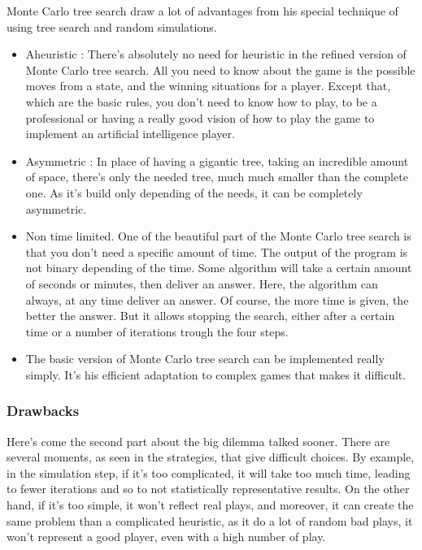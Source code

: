 Monte Carlo tree search draw a lot of advantages from his special technique of using tree search and random simulations. 
\begin{itemize}
\item Aheuristic : There's absolutely no need for heuristic in the refined version of Monte Carlo tree search. All you need to know about the game is the possible moves from a state, and the winning situations for a player. Except that, which are the basic rules, you don't need to know how to play, to be a professional or having a really good vision of how to play the game to implement an artificial intelligence player.
\item Asymmetric : In place of having a gigantic tree, taking an incredible amount of space, there's only the needed tree, much much smaller than the complete one. As it's build only depending of the needs, it can be completely asymmetric. 
\item Non time limited. One of the beautiful part of the Monte Carlo tree search is that you don't need a specific amount of time. The output of the program is not binary depending of the time. Some algorithm will take a certain amount of seconds or minutes, then deliver an answer. Here, the algorithm can always, at any time deliver an answer. Of course, the more time is given, the better the answer. But it allows stopping the search, either after a certain time or a number of iterations trough the four steps. 
\item The basic version of Monte Carlo tree search can be implemented really simply. It's his efficient adaptation to complex games that makes it difficult. 
\end{itemize}

\subsubsection{Drawbacks}

Here's come the second part about the big dilemma talked sooner.  There are several moments, as seen in the strategies, that give difficult choices. By example, in the simulation step, if it's too complicated, it will take too much time, leading to fewer iterations and so to not statistically representative results. On the other hand, if it's too simple, it won't reflect real plays, and moreover, it can create the same problem than a complicated heuristic, as it do a lot of random bad plays, it won't represent a good player, even with a high number of play. 

